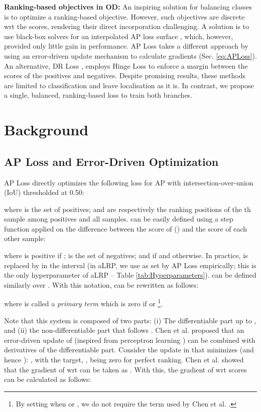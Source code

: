 \documentclass{article}
\begin{document}
\textbf{Ranking-based objectives in OD:} An inspiring solution for balancing classes is to optimize a ranking-based objective. However, such objectives are discrete wrt the scores, rendering their direct incorporation challenging. A solution is to use black-box solvers for an interpolated AP loss surface \cite{BlackboxCombinatorialSolvers}, which, however, provided only little gain in performance. AP Loss \cite{APLoss} takes a different approach by using an error-driven update mechanism to calculate gradients (Sec. \ref{eq:APLoss}). An alternative, DR Loss \cite{DRLoss}, employs Hinge Loss to enforce a margin between the scores of the positives and negatives. Despite promising results, these methods are limited to classification and leave localisation as it is. In contrast, we propose a single, balanced, ranking-based loss  to train both branches.



 \section{Background}
\label{subsec:background}




\subsection{AP Loss and Error-Driven Optimization}
\label{subsec:APLoss}

AP Loss \cite{APLoss} directly optimizes the following loss for AP with intersection-over-union (IoU) thresholded at 0.50:

where  is the set of positives;  and  are respectively the ranking positions of the th sample among positives and all samples.  can be easily defined using a step function  applied on the  difference between the score of  () and the score of each other sample:

where  is positive if ;  is the set of negatives; and  if  and  otherwise. In practice,  is replaced by  in the interval  (in aLRP, we use  as set by AP Loss \cite{APLoss} empirically; this is the only hyperparameter of aLRP -- Table \ref{tab:Hyperparameters}).  can be defined similarly over . With this notation,  can  be rewritten as follows:

where   is called a \textit{primary term} which is zero if  or 
\footnote{By setting  when  or , we do not require the  term used by Chen et al. \cite{APLoss}.}.

Note that this system is composed of two parts: (i) The differentiable part up to , and (ii) the non-differentiable part that follows . Chen et al. proposed that an error-driven update of  (inspired from perceptron learning \cite{Rosenblatt}) can be combined with derivatives of the differentiable part. Consider the update in  that minimizes  (and hence ): , with the target, , being zero for perfect ranking. Chen et al. showed that the gradient of  wrt  can be taken as . With this, the gradient of  wrt scores can be calculated as follows:
\end{document}
